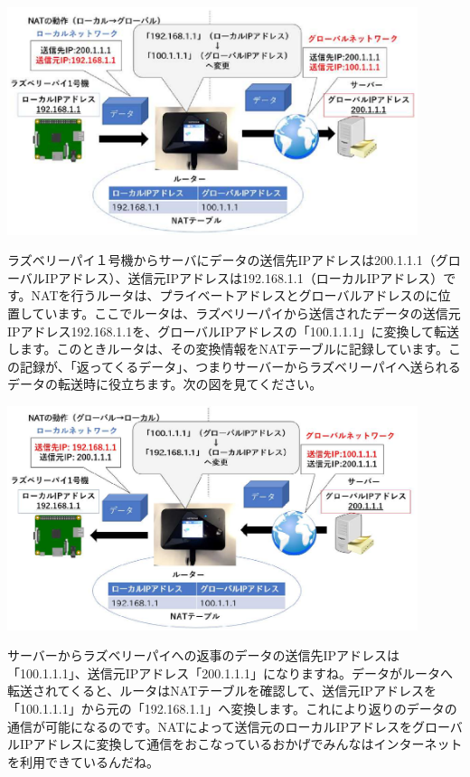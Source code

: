 \documentclass[a4paper,12pt,dvipdfmx]{jarticle}
\begin{document}
\centering
\includegraphics[width=0.9\textwidth]{ome7-img029}
\flushleft


\bigskip


\clearpage

ラズベリーパイ１号機からサーバにデータの送信先IPアドレスは200.1.1.1（グローバルIPアドレス）、送信元IPアドレスは192.168.1.1（ローカルIPアドレス）です。NATを行うルータは、プライベートアドレスとグローバルアドレスのに位置しています。ここでルータは、ラズベリーパイから送信されたデータの送信元IPアドレス192.168.1.1を、グローバルIPアドレスの「100.1.1.1」に変換して転送します。このときルータは、その変換情報をNATテーブルに記録しています。この記録が、「返ってくるデータ」、つまりサーバーからラズベリーパイへ送られるデータの転送時に役立ちます。次の図を見てください。



\centering
\includegraphics[width=0.9\textwidth]{ome7-img030}
\flushleft



\bigskip

サーバーからラズベリーパイへの返事のデータの送信先IPアドレスは「100.1.1.1」、送信元IPアドレス「200.1.1.1」になりますね。データがルータへ転送されてくると、ルータはNATテーブルを確認して、送信元IPアドレスを「100.1.1.1」から元の「192.168.1.1」へ変換します。これにより返りのデータの通信が可能になるのです。NATによって送信元のローカルIPアドレスをグローバルIPアドレスに変換して通信をおこなっているおかげでみんなはインターネットを利用できているんだね。
\end{document}

